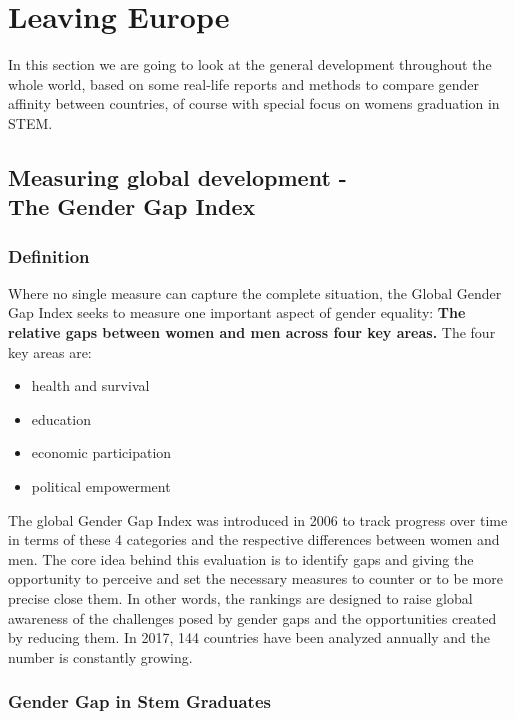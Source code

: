 	\section{Leaving Europe}
	In this section we are going to look at the general development throughout the whole world, based on some real-life reports and methods to compare gender affinity between countries, of course with special focus on womens graduation in STEM.
	
	\subsection{Measuring global development - \\The Gender Gap Index}
	
	\subsubsection{Definition}
	
	Where no single measure can capture the complete situation, the Global Gender Gap Index seeks to measure one important aspect of gender equality: \textbf{The relative gaps between women and men across four key areas.}
	The four key areas are: \cite{tgender}
	\begin{itemize}
		\item health and survival
		\item education
		\item economic participation
		\item political empowerment
	\end{itemize}
	The global Gender Gap Index was introduced in 2006 to track progress over time in terms of these 4 categories and the respective differences between women and men. The core idea behind this evaluation is to identify gaps and giving the opportunity to perceive and set the necessary measures to counter or to be more precise close them. In other words, the rankings are designed to raise global awareness of the challenges posed by gender gaps and the opportunities created by reducing them. In 2017, 144 countries have been analyzed annually and the number is constantly growing.
	
	\subsubsection{Gender Gap in Stem Graduates}
	
	
